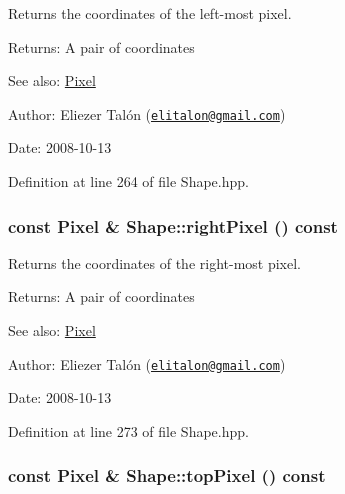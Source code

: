 Returns the coordinates of the left-most pixel. 

\begin{Desc}
\item[Returns:]A pair of coordinates\end{Desc}
\begin{Desc}
\item[See also:]\hyperlink{_pixel_8hpp_535e59456e3e633842529cfa8ea103c4}{Pixel}\end{Desc}
\begin{Desc}
\item[Author:]Eliezer Talón (\href{mailto:elitalon@gmail.com}{\tt elitalon@gmail.com}) \end{Desc}
\begin{Desc}
\item[Date:]2008-10-13 \end{Desc}


Definition at line 264 of file Shape.hpp.\hypertarget{class_shape_c265e43fa90ee2ab7c9cd3a3d1e96d82}{
\subsubsection[rightPixel]{\setlength{\rightskip}{0pt plus 5cm}const {\bf Pixel} \& Shape::rightPixel () const}}
\label{class_shape_c265e43fa90ee2ab7c9cd3a3d1e96d82}


Returns the coordinates of the right-most pixel. 

\begin{Desc}
\item[Returns:]A pair of coordinates\end{Desc}
\begin{Desc}
\item[See also:]\hyperlink{_pixel_8hpp_535e59456e3e633842529cfa8ea103c4}{Pixel}\end{Desc}
\begin{Desc}
\item[Author:]Eliezer Talón (\href{mailto:elitalon@gmail.com}{\tt elitalon@gmail.com}) \end{Desc}
\begin{Desc}
\item[Date:]2008-10-13 \end{Desc}


Definition at line 273 of file Shape.hpp.\hypertarget{class_shape_063c4934d8c1cd4b02e4e3e4a604f62e}{
\subsubsection[topPixel]{\setlength{\rightskip}{0pt plus 5cm}const {\bf Pixel} \& Shape::topPixel () const}}
\label{class_shape_063c4934d8c1cd4b02e4e3e4a604f62e}


